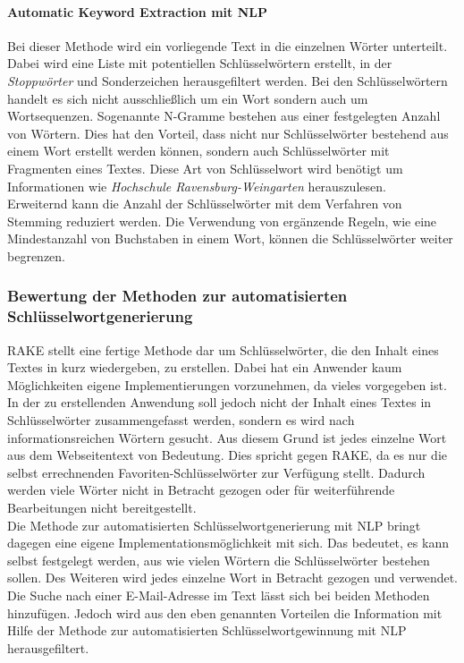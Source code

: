 			\paragraph{Automatic Keyword Extraction mit NLP}
			Bei dieser Methode wird ein vorliegende Text in die einzelnen Wörter unterteilt. Dabei wird eine Liste mit potentiellen Schlüsselwörtern erstellt, in der \textit{Stoppwörter} und Sonderzeichen herausgefiltert werden. Bei den Schlüsselwörtern handelt es sich nicht ausschließlich um ein Wort sondern auch um Wortsequenzen. Sogenannte N-Gramme bestehen aus einer festgelegten Anzahl von Wörtern. Dies hat den Vorteil, dass nicht nur Schlüsselwörter bestehend aus einem Wort erstellt werden können, sondern auch Schlüsselwörter mit Fragmenten eines Textes. Diese Art von Schlüsselwort wird benötigt um Informationen wie \textit{Hochschule Ravensburg-Weingarten} herauszulesen.\\
			Erweiternd kann die Anzahl der Schlüsselwörter mit dem Verfahren von Stemming reduziert werden. Die Verwendung von ergänzende Regeln, wie eine Mindestanzahl von Buchstaben in einem Wort, können die Schlüsselwörter weiter begrenzen.
	
		\subsubsection{Bewertung der Methoden zur automatisierten Schlüsselwortgenerierung}
		RAKE stellt eine fertige Methode dar um Schlüsselwörter, die den Inhalt eines Textes in kurz wiedergeben, zu erstellen. Dabei hat ein Anwender kaum Möglichkeiten eigene Implementierungen vorzunehmen, da vieles vorgegeben ist. In der zu erstellenden Anwendung soll jedoch nicht der Inhalt eines Textes in Schlüsselwörter zusammengefasst werden, sondern es wird nach informationsreichen Wörtern gesucht. Aus diesem Grund ist jedes einzelne Wort aus dem Webseitentext von Bedeutung. Dies spricht gegen RAKE, da es nur die selbst errechnenden Favoriten-Schlüsselwörter zur Verfügung stellt. Dadurch werden viele Wörter nicht in Betracht gezogen oder für weiterführende Bearbeitungen nicht bereitgestellt.\\
		Die Methode zur automatisierten Schlüsselwortgenerierung mit NLP bringt dagegen eine eigene Implementationsmöglichkeit mit sich. Das bedeutet, es kann selbst festgelegt werden, aus wie vielen Wörtern die Schlüsselwörter bestehen sollen. Des Weiteren wird jedes einzelne Wort in Betracht gezogen und verwendet.\\ Die Suche nach einer E-Mail-Adresse im Text lässt sich bei beiden Methoden hinzufügen. Jedoch wird aus den eben genannten Vorteilen die Information mit Hilfe der Methode zur automatisierten Schlüsselwortgewinnung mit NLP herausgefiltert.
		
